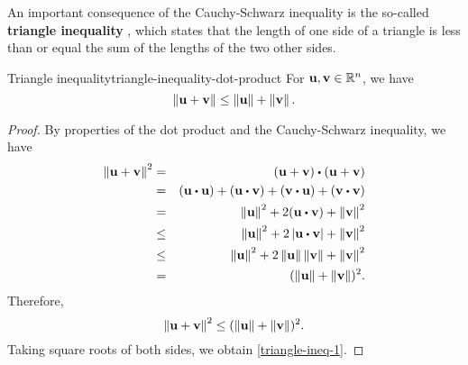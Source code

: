 An important consequence of the Cauchy-Schwarz inequality is the
so-called \textbf{triangle inequality}%
, which states that the length
of one side of a triangle is less than or equal the sum of the lengths
of the two other sides.

\begin{proposition}{Triangle inequality}{triangle-inequality-dot-product}
  For\/ $\vect{u},\vect{v}\in \R^n$, we have
  \begin{equation}\label{triangle-ineq-1}
    \norm{\vect{u} + \vect{v}} \leq \norm{\vect{u}} + \norm{\vect{v}}.
  \end{equation}

  \begin{center}
  \end{center}
\end{proposition}

\begin{proof}
  By properties of the dot product and the Cauchy-Schwarz inequality,
  we have
  \begin{eqnarray*}
    \norm{\vect{u}+\vect{v}}^2
    &=& (\vect{u}+\vect{v})\dotprod(\vect{u}+\vect{v}) \\
    &=& (\vect{u}\dotprod\vect{u})+(\vect{u}\dotprod\vect{v})+(\vect{v}\dotprod\vect{u})+(\vect{v}\dotprod\vect{v}) \\
    &=& \norm{\vect{u}}^2+2(\vect{u}\dotprod\vect{v})+\norm{\vect{v}}^2 \\
    &\leq& \norm{\vect{u}}^2+2\abs{\vect{u}\dotprod\vect{v}}+\norm{\vect{v}}^2 \\
    &\leq& \norm{\vect{u}}^2+2\norm{\vect{u}}\norm{\vect{v}}+\norm{\vect{v}}^2 \\
    &=& (\norm{\vect{u}}+\norm{\vect{v}})^2.
  \end{eqnarray*}
  Therefore,
  \begin{equation*}
    \norm{\vect{u}+\vect{v}}^2\leq(\norm{\vect{u}}+\norm{\vect{v}})^2.
  \end{equation*}
  Taking square roots of both sides, we obtain \eqref{triangle-ineq-1}.
\end{proof}

